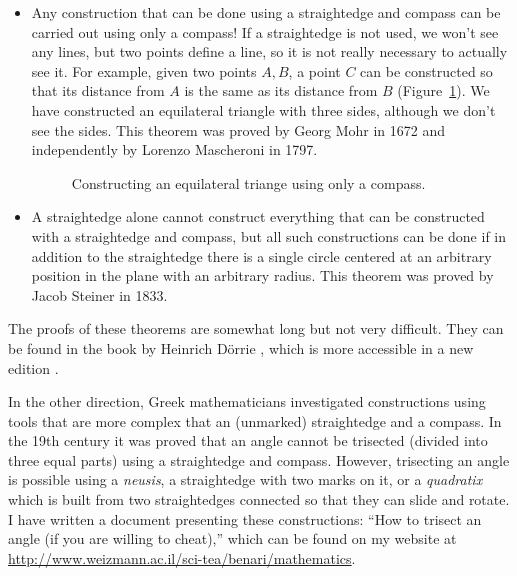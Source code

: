 \documentclass[11pt,a4paper]{article}
\begin{document}
\begin{itemize}
\item Any construction that can be done using a straightedge and compass can be carried out using only a compass! If a straightedge is not used, we won't see any lines, but two points define a line, so it is not really necessary to actually see it. For example, given two points $A,B$, a point $C$ can be constructed so that its distance from $A$ is the same as its distance from $B$ (Figure~\ref{fig.mm}). We have constructed an equilateral triangle with three sides, although we don't see the sides.  This theorem was proved by Georg Mohr in 1672 and independently by Lorenzo Mascheroni in 1797.
\begin{figure}[H]
\begin{center}
\caption{Constructing an equilateral triange using only a compass.}\label{fig.mm}
\end{center}
\end{figure}
\vspace*{-4ex}
\item  A straightedge alone cannot construct everything that can be constructed with a straightedge and compass, but all such constructions can be done if in addition to the straightedge there is a single circle centered at an arbitrary position in the plane with an arbitrary radius. This theorem was proved by Jacob Steiner in 1833.
\end{itemize}
The proofs of these theorems are somewhat long but not very difficult. They can be found in the book by Heinrich D\"{o}rrie \cite{dorrie1}, which is more accessible in a new edition \cite{dorrie2}.

In the other direction, Greek mathematicians investigated constructions using tools that are more complex that an (unmarked) straightedge and a compass. In the 19th century it was proved that an angle cannot be trisected (divided into three equal parts) using a straightedge and compass. However, trisecting an angle is possible using a \emph{neusis}, a straightedge with two marks on it, or a \emph{quadratix} which is built from two straightedges connected so that they can slide and rotate. I have written a document presenting these constructions: ``How to trisect an angle (if you are willing to cheat),'' which can be found on my website at \url{http://www.weizmann.ac.il/sci-tea/benari/mathematics}.
\end{document}
